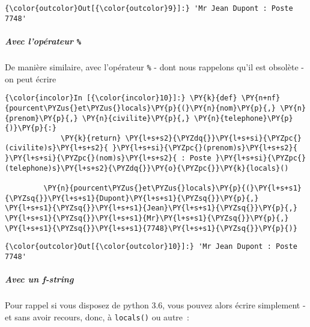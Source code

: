 \begin{Verbatim}[commandchars=\\\{\},frame=single,framerule=0.3mm,rulecolor=\color{cellframecolor}]
{\color{outcolor}Out[{\color{outcolor}9}]:} 'Mr Jean Dupont : Poste 7748'
\end{Verbatim}
            
    \hypertarget{avec-lopuxe9rateur}{%
\subparagraph{\texorpdfstring{Avec l'opérateur
\texttt{\%}}{Avec l'opérateur \%}}\label{avec-lopuxe9rateur}}

    De manière similaire, avec l'opérateur \texttt{\%} - dont nous rappelons
qu'il est obsolète - on peut écrire

    \begin{Verbatim}[commandchars=\\\{\},frame=single,framerule=0.3mm,rulecolor=\color{cellframecolor}]
{\color{incolor}In [{\color{incolor}10}]:} \PY{k}{def} \PY{n+nf}{pourcent\PYZus{}et\PYZus{}locals}\PY{p}{(}\PY{n}{nom}\PY{p}{,} \PY{n}{prenom}\PY{p}{,} \PY{n}{civilite}\PY{p}{,} \PY{n}{telephone}\PY{p}{)}\PY{p}{:}
             \PY{k}{return} \PY{l+s+s2}{\PYZdq{}}\PY{l+s+si}{\PYZpc{}(civilite)s}\PY{l+s+s2}{ }\PY{l+s+si}{\PYZpc{}(prenom)s}\PY{l+s+s2}{ }\PY{l+s+si}{\PYZpc{}(nom)s}\PY{l+s+s2}{ : Poste }\PY{l+s+si}{\PYZpc{}(telephone)s}\PY{l+s+s2}{\PYZdq{}}\PY{o}{\PYZpc{}}\PY{k}{locals}()
         
         \PY{n}{pourcent\PYZus{}et\PYZus{}locals}\PY{p}{(}\PY{l+s+s1}{\PYZsq{}}\PY{l+s+s1}{Dupont}\PY{l+s+s1}{\PYZsq{}}\PY{p}{,} \PY{l+s+s1}{\PYZsq{}}\PY{l+s+s1}{Jean}\PY{l+s+s1}{\PYZsq{}}\PY{p}{,} \PY{l+s+s1}{\PYZsq{}}\PY{l+s+s1}{Mr}\PY{l+s+s1}{\PYZsq{}}\PY{p}{,} \PY{l+s+s1}{\PYZsq{}}\PY{l+s+s1}{7748}\PY{l+s+s1}{\PYZsq{}}\PY{p}{)}
\end{Verbatim}


\begin{Verbatim}[commandchars=\\\{\},frame=single,framerule=0.3mm,rulecolor=\color{cellframecolor}]
{\color{outcolor}Out[{\color{outcolor}10}]:} 'Mr Jean Dupont : Poste 7748'
\end{Verbatim}
            
    \hypertarget{avec-un-f-string}{%
\subparagraph{\texorpdfstring{Avec un
\emph{f-string}}{Avec un f-string}}\label{avec-un-f-string}}

    Pour rappel si vous disposez de python 3.6, vous pouvez alors écrire
simplement - et sans avoir recours, donc, à \texttt{locals()} ou autre~:

